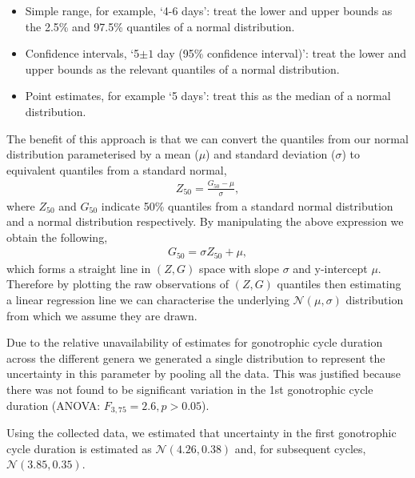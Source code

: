 \documentclass[12pt]{article}
\begin{document}
{\begin{itemize}
	\item Simple range, for example, `4-6 days': treat the lower and upper bounds as the 2.5\% and 97.5\% quantiles of a normal distribution.
	\item Confidence intervals, `5$\pm 1$ day (95\% confidence interval)': treat the lower and upper bounds as the relevant quantiles of a normal distribution.
	\item Point estimates, for example `5 days': treat this as the median of a normal distribution.
\end{itemize}

The benefit of this approach is that we can convert the quantiles from our normal distribution parameterised by a mean ($\mu$) and standard deviation ($\sigma$) to equivalent quantiles from a standard normal,
%
\begin{align}
Z_{50} = \frac{G_{50} - \mu}{\sigma},
\end{align}
%
where $Z_{50}$ and $G_{50}$ indicate 50\% quantiles from a standard normal distribution and a normal distribution respectively. By manipulating the above expression we obtain the following,
%
\begin{align}
G_{50} = \sigma Z_{50} + \mu,
\end{align}
%
which forms a straight line in $(Z,G)$ space with slope $\sigma$ and y-intercept $\mu$. Therefore by plotting the raw observations of $(Z,G)$ quantiles then estimating a linear regression line we can characterise the underlying $\mathcal{N}(\mu,\sigma)$ distribution from which we assume they are drawn.

Due to the relative unavailability of estimates for gonotrophic cycle duration across the different genera we generated a single distribution to represent the uncertainty in this parameter by pooling all the data. This was justified because there was not found to be significant variation in the 1st gonotrophic cycle duration (ANOVA: $F_{3,75}=2.6,p>0.05$).

Using the collected data, we estimated that uncertainty in the first gonotrophic cycle duration is estimated as $\mathcal{N}(4.26, 0.38)$ and, for subsequent cycles, $\mathcal{N}(3.85, 0.35)$.

}
\end{document}
